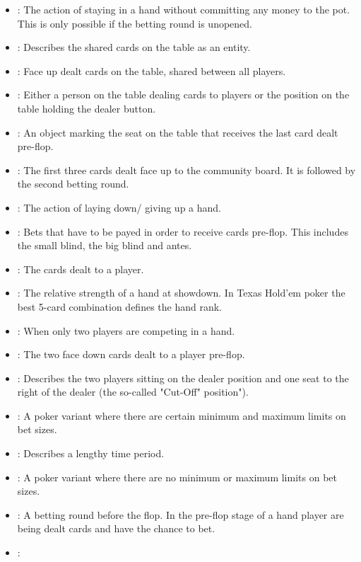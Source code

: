 \begin{appendices}
\begin{itemize}
\item {}:
The action of staying in a hand without committing any money to the pot. This is only possible if the betting round is unopened.
\item {}:
Describes the shared cards on the table as an entity.
\item {}:
Face up dealt cards on the table, shared between all players.
\item {}:
Either a person on the table dealing cards to players or the position on the table holding the dealer button.
\item {}:
An object marking the seat on the table that receives the last card dealt pre-flop. 
\item {}: The first three cards dealt face up to the community board. It  is followed by the second betting round.
\item {}: 
The action of laying down/ giving up a hand.
\item {}:
Bets that have to be payed in order to receive cards pre-flop. This includes the small blind, the big blind and antes.
\item {}:
The cards dealt to a player.
\item {}:
The relative strength of a hand at showdown. In Texas Hold'em poker the best 5-card combination defines the hand rank.
\item {}:
When only two players are competing in a hand.
\item {}:
The two face down cards dealt to a player pre-flop.
\item {}:
Describes the two players sitting on the dealer position and one seat to the right of the dealer (the so-called "Cut-Off" position").
\item {}:
A poker variant where there are certain minimum and maximum limits on bet sizes.
\item {}:
Describes a lengthy time period.
\item {}:
A poker variant where there are no minimum or maximum limits on bet sizes.
\item {}:
A betting round before the flop. In the pre-flop stage of a hand player are being dealt cards and have the chance to bet.
\item {}:

\end{itemize}
\end{appendices}
